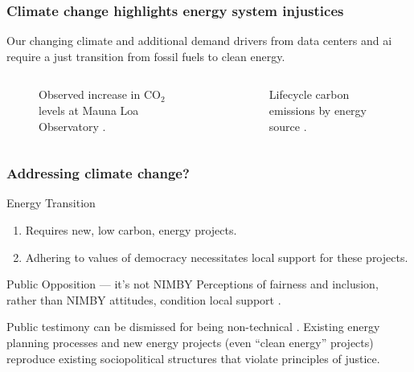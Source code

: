 \begin{frame}
    \frametitle{Climate change highlights energy system injustices}
    Our changing climate and additional demand drivers from data 
    centers and \gls{ai} require a just transition from fossil 
    fuels to clean energy.
    \begin{columns}
        \column[t]{5cm}
        \begin{figure}
            \centering
            \resizebox{\columnwidth}{!}{}
            \caption{Observed increase in CO$_2$ levels at Mauna Loa Observatory
            \cite{kane_atmospheric_1996}.}
            \label{figure:mauna-loa}
        \end{figure}
        
        \column[t]{5cm}
        \begin{figure}
            \centering
            \resizebox{\columnwidth}{!}{}
            \caption{Lifecycle carbon emissions by energy source
            \cite{united_nations_economic_commission_for_europe_carbon_2022}.}
            \label{figure:energy-emissions}
        \end{figure}
    \end{columns}

\end{frame}

\begin{frame}
    \frametitle{Addressing climate change?}

        \begin{block}{Energy Transition}
            \begin{enumerate}
                \item Requires new, low carbon, energy projects.
                \item Adhering to values of democracy necessitates local support
                for these projects.
            \end{enumerate}
        \end{block}
        \begin{block}{Public Opposition --- it's not NIMBY}
            Perceptions of fairness and inclusion, rather than NIMBY attitudes,
            condition local support
            \cite{konisky_proximity_2021,aitken_why_2010,stokes_prevalence_2023,firestone_public_2012-1}.
        \end{block}
        \begin{block}{}
            Public testimony can be dismissed for being non-technical
            \cite{johnson_dakota_2021}. Existing energy planning processes and
            new energy projects (even ``clean energy'' projects) reproduce
            existing sociopolitical structures that violate principles of
            justice.
        \end{block}
\end{frame}

